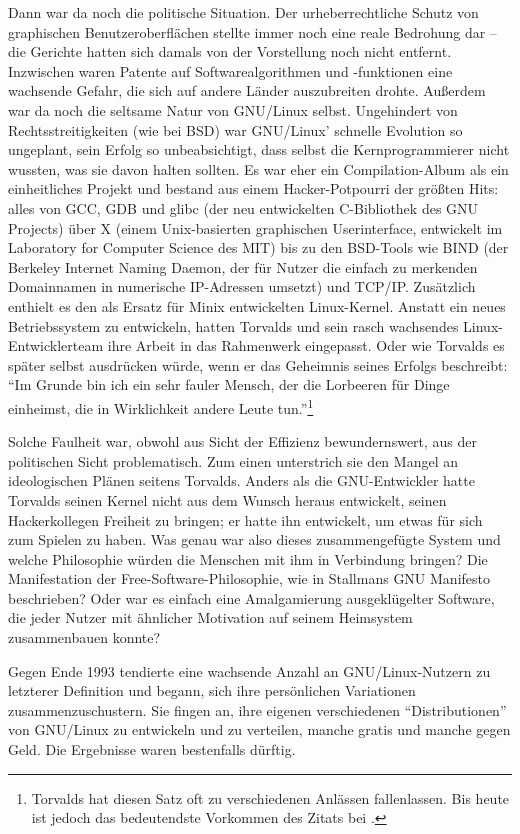 Dann war da noch die politische Situation. Der urheberrechtliche Schutz von graphischen Benutzeroberflächen stellte immer noch eine reale Bedrohung dar – die Gerichte hatten sich damals von der Vorstellung noch nicht entfernt. Inzwischen waren Patente auf Softwarealgorithmen und -funktionen eine wachsende Gefahr, die sich auf andere Länder auszubreiten drohte.
Außerdem war da noch die seltsame Natur von GNU/Linux selbst. Ungehindert von Rechtsstreitigkeiten (wie bei BSD) war GNU/Linux' schnelle Evolution so ungeplant, sein Erfolg so unbeabsichtigt, dass selbst die Kernprogrammierer nicht wussten, was sie davon halten sollten. Es war eher ein Compilation-Album als ein einheitliches Projekt und bestand aus einem Hacker-Potpourri der größten Hits: alles von GCC, GDB und glibc (der neu entwickelten C-Bibliothek des GNU Projects) über X (einem Unix-basierten graphischen Userinterface, entwickelt im Laboratory for Computer Science des MIT) bis zu den BSD-Tools wie BIND (der Berkeley Internet Naming Daemon, der für Nutzer die einfach zu merkenden Domainnamen in numerische IP-Adressen umsetzt) und TCP/IP. Zusätzlich enthielt es den als Ersatz für Minix entwickelten Linux-Kernel. Anstatt ein neues Betriebssystem zu entwickeln, hatten Torvalds und sein rasch wachsendes Linux-Entwicklerteam ihre Arbeit in das Rahmenwerk eingepasst. Oder wie Torvalds es später selbst ausdrücken würde, wenn er das Geheimnis seines Erfolgs beschreibt: "`Im Grunde bin ich ein sehr fauler Mensch, der die Lorbeeren für Dinge einheimst, die in Wirklichkeit andere Leute tun."'\footnote{Torvalds hat diesen Satz oft zu verschiedenen Anlässen fallenlassen. Bis heute ist jedoch das bedeutendste Vorkommen des Zitats bei \cite[][]{catb}.}

Solche Faulheit war, obwohl aus Sicht der Effizienz bewundernswert, aus der politischen Sicht problematisch. Zum einen unterstrich sie den Mangel an ideologischen Plänen seitens Torvalds. Anders als die GNU-Entwickler hatte Torvalds seinen Kernel nicht aus dem Wunsch heraus entwickelt, seinen Hackerkollegen Freiheit zu bringen; er hatte ihn entwickelt, um etwas für sich zum Spielen zu haben. Was genau war also dieses zusammengefügte System und welche Philosophie würden die Menschen mit ihm in Verbindung bringen? Die Manifestation der Free-Software-Philosophie, wie in Stallmans GNU Manifesto beschrieben? Oder war es einfach eine Amalgamierung ausgeklügelter Software, die jeder Nutzer mit ähnlicher Motivation auf seinem Heimsystem zusammenbauen konnte?

Gegen Ende 1993 tendierte eine wachsende Anzahl an GNU/Linux-Nutzern zu letzterer Definition und begann, sich ihre persönlichen Variationen zusammenzuschustern. Sie fingen an, ihre eigenen verschiedenen "`Distributionen"' von GNU/Linux zu entwickeln und zu verteilen, manche gratis und manche gegen Geld. Die Ergebnisse waren bestenfalls dürftig.

